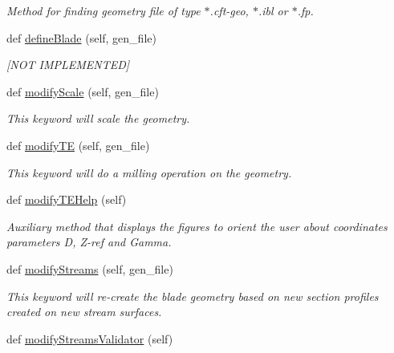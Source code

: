 \begin{DoxyCompactItemize}
\begin{DoxyCompactList}\small\item\em Method for finding geometry file of type $\ast$.cft-\/geo, $\ast$.ibl or $\ast$.fp. \end{DoxyCompactList}\item 
def \hyperlink{classbladepro__modules_1_1inputfile__writer_1_1_input_writer_window_abf54bdb00a2743fb488463ab7247b146}{define\+Blade} (self, gen\+\_\+file)
\begin{DoxyCompactList}\small\item\em \mbox{[}N\+OT I\+M\+P\+L\+E\+M\+E\+N\+T\+ED\mbox{]} \end{DoxyCompactList}\item 
def \hyperlink{classbladepro__modules_1_1inputfile__writer_1_1_input_writer_window_aa1bef88b3d57a567e44548155e7ec02f}{modify\+Scale} (self, gen\+\_\+file)
\begin{DoxyCompactList}\small\item\em This keyword will scale the geometry. \end{DoxyCompactList}\item 
def \hyperlink{classbladepro__modules_1_1inputfile__writer_1_1_input_writer_window_a52d4edd27f78b5559e6e3683c6adb3bc}{modify\+TE} (self, gen\+\_\+file)
\begin{DoxyCompactList}\small\item\em This keyword will do a milling operation on the geometry. \end{DoxyCompactList}\item 
def \hyperlink{classbladepro__modules_1_1inputfile__writer_1_1_input_writer_window_a0894116159595156b62859c796bdea1d}{modify\+T\+E\+Help} (self)
\begin{DoxyCompactList}\small\item\em Auxiliary method that displays the figures to orient the user about coordinates parameters D, Z-\/ref and Gamma. \end{DoxyCompactList}\item 
def \hyperlink{classbladepro__modules_1_1inputfile__writer_1_1_input_writer_window_a66f6209a0c4caa0ba5e25b5fd913eff5}{modify\+Streams} (self, gen\+\_\+file)
\begin{DoxyCompactList}\small\item\em This keyword will re-\/create the blade geometry based on new section profiles created on new stream surfaces. \end{DoxyCompactList}\item 
def \hyperlink{classbladepro__modules_1_1inputfile__writer_1_1_input_writer_window_af60dda179dc289691a59b52cb8ed3e70}{modify\+Streams\+Validator} (self)

\end{DoxyCompactItemize}
